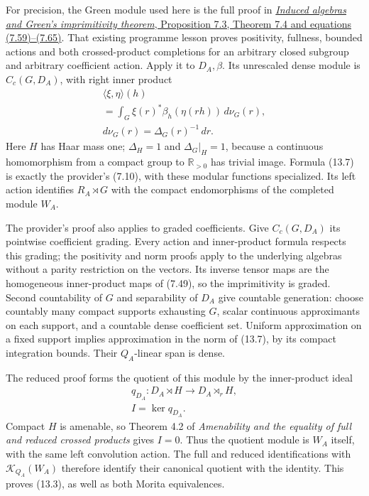 \documentclass[
  11pt,
]{article}
\begin{document}
For precision, the Green module used here is the full proof in
\href{https://kokunoyumeto.github.io/open-math-courses/courses/KT-CP/KT-CP-07.html}{\emph{Induced
algebras and Green's imprimitivity theorem}, Proposition 7.3, Theorem
7.4 and equations (7.59)--(7.65)}. That existing programme lesson proves
positivity, fullness, bounded actions and both crossed-product
completions for an arbitrary closed subgroup and arbitrary coefficient
action. Apply it to \(D_A,\beta\). Its unrescaled dense module is
\(C_c(G,D_A)\), with right inner product \[
\begin{gathered}
\langle\xi,\eta\rangle(h)\\
 =\int_G \xi(r)^*\beta_h(\eta(rh))\,d\nu_G(r),\\
d\nu_G(r)=\Delta_G(r)^{-1}\,dr .
\end{gathered}
\tag{13.7}
\] Here \(H\) has Haar mass one; \(\Delta_H=1\) and \(\Delta_G|_H=1\),
because a continuous homomorphism from a compact group to
\(\mathbb R_{>0}\) has trivial image. Formula (13.7) is exactly the
provider's (7.10), with these modular functions specialized. Its left
action identifies \(R_A\rtimes G\) with the compact endomorphisms of the
completed module \(W_A\).

The provider's proof also applies to graded coefficients. Give
\(C_c(G,D_A)\) its pointwise coefficient grading. Every action and
inner-product formula respects this grading; the positivity and norm
proofs apply to the underlying algebras without a parity restriction on
the vectors. Its inverse tensor maps are the homogeneous inner-product
maps of (7.49), so the imprimitivity is graded. Second countability of
\(G\) and separability of \(D_A\) give countable generation: choose
countably many compact supports exhausting \(G\), scalar continuous
approximants on each support, and a countable dense coefficient set.
Uniform approximation on a fixed support implies approximation in the
norm of (13.7), by its compact integration bounds. Their \(Q_A\)-linear
span is dense.

The reduced proof forms the quotient of this module by the inner-product
ideal \[
\begin{gathered}
q_{D_A}:D_A\rtimes H\longrightarrow D_A\rtimes_rH,\\
I=\ker q_{D_A}.
\end{gathered}
\tag{13.8}
\] Compact \(H\) is amenable, so Theorem 4.2 of \emph{Amenability and
the equality of full and reduced crossed products} gives \(I=0\). Thus
the quotient module is \(W_A\) itself, with the same left convolution
action. The full and reduced identifications with
\(\mathcal K_{Q_A}(W_A)\) therefore identify their canonical quotient
with the identity. This proves (13.3), as well as both Morita
equivalences.
\end{document}
